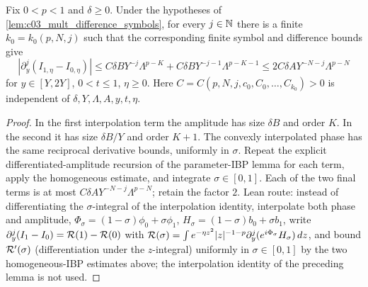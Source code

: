\begin{lemma}
  \label{lem:c03_mult_difference_integral_bound}
  Fix $0<p<1$ and $\delta\ge0$. Under the hypotheses of \cref{lem:c03_mult_difference_symbols}, for every $j\in\mathbb{N}$
  there is a finite $k_0=k_0(p,N,j)$ such that the corresponding finite symbol and difference bounds give
  \[
    |\partial_y^j(I_{1,\eta}-I_{0,\eta})|
      \le C\delta BY^{-j}\Lambda^{p-K}
           +C\delta BY^{-j-1}\Lambda^{p-K-1}
      \le 2C\delta AY^{-N-j}\Lambda^{p-N}
  \]
  for $y\in[Y,2Y]$, $0<t\le1$, $\eta\ge0$.
  Here $C=C(p,N,j,c_0,C_0,\ldots,C_{k_0})>0$ is independent of $\delta,Y,\Lambda,A,y,t,\eta$.
\end{lemma}
\begin{proof}
  In the first interpolation term the amplitude has size $\delta B$ and order $K$.
  In the second it has size $\delta B/Y$ and order $K+1$.
  The convexly interpolated phase has the same reciprocal derivative bounds, uniformly in $\sigma$.
  Repeat the explicit differentiated-amplitude recursion of the parameter-IBP lemma for each term,
  apply the homogeneous estimate, and integrate $\sigma\in[0,1]$.
  Each of the two final terms is at most $C\delta AY^{-N-j}\Lambda^{p-N}$; retain the factor $2$.
  Lean route: instead of differentiating the $\sigma$-integral of the interpolation identity, interpolate both phase and amplitude, $\Phi_\sigma=(1-\sigma)\phi_0+\sigma\phi_1$, $H_\sigma=(1-\sigma)b_0+\sigma b_1$, write $\partial_y^j(I_1-I_0)=\mathcal{R}(1)-\mathcal{R}(0)$ with $\mathcal{R}(\sigma)=\int e^{-\eta z^2}|z|^{-1-p}\partial_y^j(e^{i\Phi_\sigma}H_\sigma)\,dz$, and bound $\mathcal{R}'(\sigma)$ (differentiation under the $z$-integral) uniformly in $\sigma\in[0,1]$ by the two homogeneous-IBP estimates above; the interpolation identity of the preceding lemma is not used.
\end{proof}

